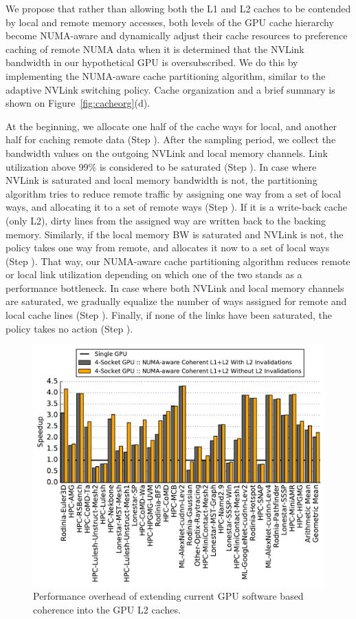 We propose that rather than allowing both the L1 and L2 caches to be 
contended by local and remote memory accesses, both levels of the GPU cache 
hierarchy become NUMA-aware and dynamically adjust their cache resources to 
preference caching of remote NUMA data when it is determined that the NVLink 
bandwidth in our hypothetical GPU is oversubscribed. We do this by 
implementing the NUMA-aware cache partitioning algorithm, similar to the 
adaptive NVLink switching policy. Cache organization and a brief summary is 
shown on Figure~\ref{fig:cacheorg}(d). 

At the beginning, we allocate one half of the cache ways for local, and 
another half for caching remote data (Step ). After the sampling 
period, we collect the bandwidth values on the outgoing NVLink and local 
memory channels. Link utilization above 99\% is considered to be saturated 
(Step ). In case where NVLink is saturated and local memory 
bandwidth is not, the partitioning algorithm tries to reduce remote traffic 
by assigning one way from a set of local ways, and allocating it to a set of 
remote ways (Step ). If it is a write-back cache (only L2), dirty 
lines from the assigned way are written back to the backing memory. 
Similarly, if the local memory BW is saturated and NVLink is not, the policy 
takes one way from remote, and allocates it now to a set of local ways (Step 
). That way, our NUMA-aware cache partitioning algorithm reduces 
remote or local link utilization depending on which one of the two stands as 
a performance bottleneck. In case where both NVLink and local memory channels 
are saturated, we gradually equalize the number of ways assigned for remote 
and local cache lines (Step ). Finally, if none of the links have 
been saturated, the policy takes no action (Step ).

\begin{figure}[t]
    \centering
    \includegraphics[width=1.0\columnwidth]{figures/plot_no_inval_WB.pdf}
    \caption{Performance overhead of extending current GPU software based coherence
    into the GPU L2 caches.}
    \label{fig:invalidations}
    \vspace{-.2in}
\end{figure}

